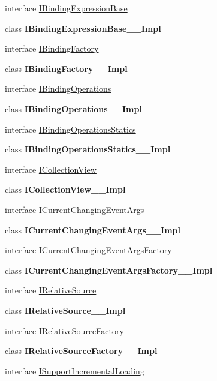 \begin{DoxyCompactItemize}
\item 
interface \hyperlink{interface_windows_1_1_u_i_1_1_xaml_1_1_data_1_1_i_binding_expression_base}{I\+Binding\+Expression\+Base}
\item 
class {\bfseries I\+Binding\+Expression\+Base\+\_\+\+\_\+\+Impl}
\item 
interface \hyperlink{interface_windows_1_1_u_i_1_1_xaml_1_1_data_1_1_i_binding_factory}{I\+Binding\+Factory}
\item 
class {\bfseries I\+Binding\+Factory\+\_\+\+\_\+\+Impl}
\item 
interface \hyperlink{interface_windows_1_1_u_i_1_1_xaml_1_1_data_1_1_i_binding_operations}{I\+Binding\+Operations}
\item 
class {\bfseries I\+Binding\+Operations\+\_\+\+\_\+\+Impl}
\item 
interface \hyperlink{interface_windows_1_1_u_i_1_1_xaml_1_1_data_1_1_i_binding_operations_statics}{I\+Binding\+Operations\+Statics}
\item 
class {\bfseries I\+Binding\+Operations\+Statics\+\_\+\+\_\+\+Impl}
\item 
interface \hyperlink{interface_windows_1_1_u_i_1_1_xaml_1_1_data_1_1_i_collection_view}{I\+Collection\+View}
\item 
class {\bfseries I\+Collection\+View\+\_\+\+\_\+\+Impl}
\item 
interface \hyperlink{interface_windows_1_1_u_i_1_1_xaml_1_1_data_1_1_i_current_changing_event_args}{I\+Current\+Changing\+Event\+Args}
\item 
class {\bfseries I\+Current\+Changing\+Event\+Args\+\_\+\+\_\+\+Impl}
\item 
interface \hyperlink{interface_windows_1_1_u_i_1_1_xaml_1_1_data_1_1_i_current_changing_event_args_factory}{I\+Current\+Changing\+Event\+Args\+Factory}
\item 
class {\bfseries I\+Current\+Changing\+Event\+Args\+Factory\+\_\+\+\_\+\+Impl}
\item 
interface \hyperlink{interface_windows_1_1_u_i_1_1_xaml_1_1_data_1_1_i_relative_source}{I\+Relative\+Source}
\item 
class {\bfseries I\+Relative\+Source\+\_\+\+\_\+\+Impl}
\item 
interface \hyperlink{interface_windows_1_1_u_i_1_1_xaml_1_1_data_1_1_i_relative_source_factory}{I\+Relative\+Source\+Factory}
\item 
class {\bfseries I\+Relative\+Source\+Factory\+\_\+\+\_\+\+Impl}
\item 
interface \hyperlink{interface_windows_1_1_u_i_1_1_xaml_1_1_data_1_1_i_support_incremental_loading}{I\+Support\+Incremental\+Loading}

\end{DoxyCompactItemize}
